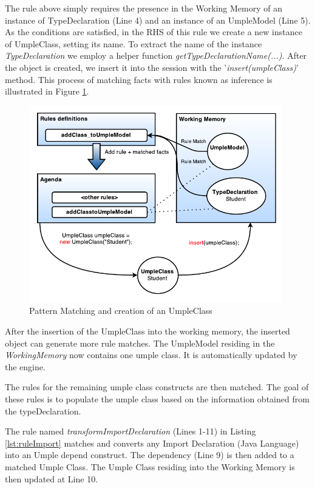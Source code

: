The rule above simply requires the presence in the Working Memory of an instance of TypeDeclaration (Line 4) and an instance of an UmpleModel (Line 5). As the conditions are satisfied, in the RHS of this rule we create a new instance of UmpleClass, setting its name. To extract the name of the instance \textit{TypeDeclaration} we employ a helper function \textit{getTypeDeclarationName(...)}. After the object is created, we insert it into the session with the '\textit{insert(umpleClass)}' method. This process of matching facts with rules known as inference is illustrated in Figure \ref{fig:ruleModel}.

\begin{figure}[h]
\centering
\includegraphics[width=0.98\textwidth]{Figures/ruleModel.pdf}
\caption{Pattern Matching and creation of an UmpleClass}
\label{fig:ruleModel}
\end{figure}

After the insertion of the UmpleClass into the working memory, the inserted object can generate more rule matches. The UmpleModel residing in the \textit{WorkingMemory} now contains one umple class. It is automatically updated by the engine.

The rules for the remaining umple class constructs are then matched. The goal of these rules is to populate the umple class based on the information obtained from the typeDeclaration. 

The rule named \textit{transformImportDeclaration} (Lines 1-11) in Listing \ref{lst:ruleImport} matches and converts any Import Declaration (Java Language) into an Umple depend construct. The dependency (Line 9) is then added to a matched Umple Class. The Umple Class residing into the Working Memory is then updated at Line 10.

